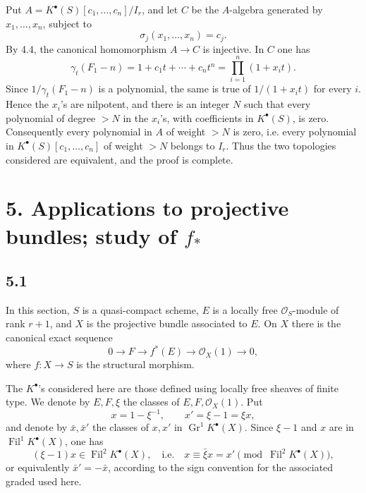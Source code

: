 \documentclass[11pt]{article}
\newcommand{\Fil}{\operatorname{Fil}}
\begin{document}
Put \(A=K^\bullet(S)[c_1,\ldots,c_n]/I_r\), and let \(C\) be the \(A\)-algebra generated by \(x_1,\ldots,x_n\), subject to
\[
  \sigma_j(x_1,\ldots,x_n)=c_j.
\]
By 4.4, the canonical homomorphism \(A\to C\) is injective. In \(C\) one has
\[
  \gamma_t(F_1-n)=1+c_1t+\cdots+c_nt^n
    =\prod_{i=1}^{n}(1+x_i t).
\]
Since \(1/\gamma_t(F_1-n)\) is a polynomial, the same is true of \(1/(1+x_i t)\) for every \(i\). Hence the \(x_i\)'s are nilpotent, and there is an integer \(N\) such that every polynomial of degree \(>N\) in the \(x_i\)'s, with coefficients in \(K^\bullet(S)\), is zero. Consequently every polynomial in \(A\) of weight \(>N\) is zero, i.e. every polynomial in \(K^\bullet(S)[c_1,\ldots,c_n]\) of weight \(>N\) belongs to \(I_r\). Thus the two topologies considered are equivalent, and the proof is complete.

\section*{5. Applications to projective bundles; study of \(f_*\)}

\subsection*{5.1}
In this section, \(S\) is a quasi-compact scheme, \(E\) is a locally free \(\mathcal O_S\)-module of rank \(r+1\), and \(X\) is the projective bundle associated to \(E\). On \(X\) there is the canonical exact sequence
\[
  0\longrightarrow F\longrightarrow f^*(E)\longrightarrow \mathcal O_X(1)\longrightarrow 0,
\]
where \(f:X\to S\) is the structural morphism.

The \(K^\bullet\)'s considered here are those defined using locally free sheaves of finite type. We denote by \(E,F,\xi\) the classes of \(E,F,\mathcal O_X(1)\). Put
\[
  x=1-\xi^{-1},\qquad x'=\xi-1=\xi x,
\]
and denote by \(\bar x,\bar x'\) the classes of \(x,x'\) in \(\operatorname{Gr}^1K^\bullet(X)\). Since \(\xi-1\) and \(x\) are in \(\Fil^1K^\bullet(X)\), one has
\[
  (\xi-1)x\in \Fil^2K^\bullet(X),
  \quad\text{i.e.}\quad x\equiv \bar\xi x=x'\pmod{\Fil^2K^\bullet(X)},
\]
or equivalently \(\bar x'=-\bar x\), according to the sign convention for the associated graded used here.
\end{document}
